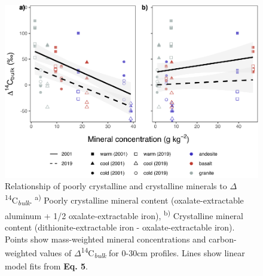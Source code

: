 \documentclass[english,man,floatsintext]{apa6}
\begin{document}
\begin{figure}

{\centering \includegraphics{sra-blk-inc-SI_files/figure-latex/min-blk30-plot-1} 

}

\caption{Relationship of poorly crystalline and crystalline minerals to \(\Delta\)\textsuperscript{14}C\textsubscript{\emph{bulk}}. \textsuperscript{a)} Poorly crystalline mineral content (oxalate-extractable aluminum + 1/2 oxalate-extractable iron), \textsuperscript{b)} Crystalline mineral content (dithionite-extractable iron - oxalate-extractable iron). Points show mass-weighted mineral concentrations and carbon-weighted values of \(\Delta\)\textsuperscript{14}C\textsubscript{\emph{bulk}} for 0-30cm profiles. Lines show linear model fits from \textbf{Eq. 5}.}\label{fig:min-blk30-plot}
\end{figure}
\end{document}
